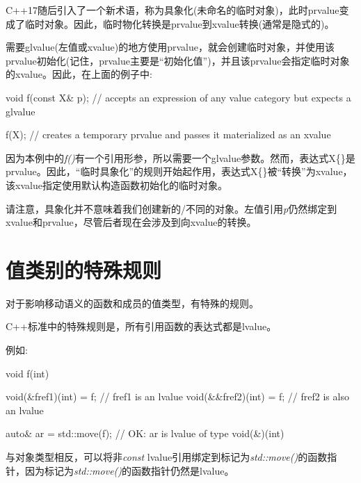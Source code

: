 
C++17随后引入了一个新术语，称为具象化(未命名的临时对象)，此时prvalue变成了临时对象。因此，临时物化转换是prvalue到xvalue转换(通常是隐式的)。\par

需要glvalue(左值或xvalue)的地方使用prvalue，就会创建临时对象，并使用该prvalue初始化(记住，prvalue主要是“初始化值”)，并且该prvalue会指定临时对象的xvalue。因此，在上面的例子中:\par

\begin{codebox}[cpp]
void f(const X& p); // accepts an expression of any value category but expects a glvalue

f(X{}); // creates a temporary prvalue and passes it materialized as an xvalue
\end{codebox}

因为本例中的\textit{f()}有一个引用形参，所以需要一个glvalue参数。然而，表达式X\{\}是prvalue。因此，“临时具象化”的规则开始起作用，表达式X\{\}被“转换”为xvalue，该xvalue指定使用默认构造函数初始化的临时对象。\par

请注意，具象化并不意味着我们创建新的/不同的对象。左值引用\textit{p}仍然绑定到xvalue和prvalue，尽管后者现在会涉及到向xvalue的转换。\par


\section{值类别的特殊规则}

对于影响移动语义的函数和成员的值类型，有特殊的规则。\par


C++标准中的特殊规则是，所有引用函数的表达式都是lvalue。\par

例如:\par

\begin{codebox}[cpp]
void f(int) {
}

void(&fref1)(int) = f; // fref1 is an lvalue
void(&&fref2)(int) = f; // fref2 is also an lvalue

auto& ar = std::move(f); // OK: ar is lvalue of type void(&)(int)
\end{codebox}

与对象类型相反，可以将非\textit{const} lvalue引用绑定到标记为\textit{std::move()}的函数指针，因为标记为\textit{std::move()}的函数指针仍然是lvalue。\par

